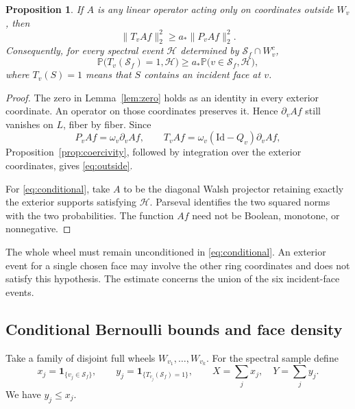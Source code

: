 \documentclass[11pt]{amsart}
\newtheorem{proposition}[theorem]{Proposition}
\theoremstyle{remark}
\newcommand{\Prob}{\mathbb P}
\newcommand{\one}{\mathbf 1}
\newcommand{\Id}{\mathrm{Id}}
\newcommand{\cS}{\mathcal S}
\newcommand{\astar}{a_*}
\begin{document}
\begin{proposition}\label{prop:outside}
If $A$ is any linear operator acting only on coordinates outside $W_v$, then
\begin{equation}\label{eq:outside}
 \|T_vAf\|_2^2\ge\astar\|P_vAf\|_2^2.
\end{equation}
Consequently, for every spectral event $\mathcal H$ determined by $\cS_f\cap W_v^c$,
\begin{equation}\label{eq:conditional}
 \Prob\bigl(T_v(\cS_f)=1,\mathcal H\bigr)
 \ge\astar\Prob\bigl(v\in\cS_f,\mathcal H\bigr),
\end{equation}
where $T_v(S)=1$ means that $S$ contains an incident face at $v$.
\end{proposition}
\begin{proof}
The zero in Lemma~\ref{lem:zero} holds as an identity in every exterior coordinate. An operator on those coordinates preserves it. Hence $\partial_vAf$ still vanishes on $L$, fiber by fiber. Since
\[
 P_vAf=\omega_v\partial_vAf,
 \qquad T_vAf=\omega_v(\Id-Q_v)\partial_vAf,
\]
Proposition~\ref{prop:coercivity}, followed by integration over the exterior coordinates, gives \eqref{eq:outside}.

For \eqref{eq:conditional}, take $A$ to be the diagonal Walsh projector retaining exactly the exterior supports satisfying $\mathcal H$. Parseval identifies the two squared norms with the two probabilities. The function $Af$ need not be Boolean, monotone, or nonnegative.
\end{proof}

The whole wheel must remain unconditioned in \eqref{eq:conditional}. An exterior event for a single chosen face may involve the other ring coordinates and does not satisfy this hypothesis. The estimate concerns the union of the six incident-face events.

\subsection{Conditional Bernoulli bounds and face density}\label{sec:amplification}

Take a family of disjoint full wheels $W_{v_1},\ldots,W_{v_k}$. For the spectral sample define
\[
 x_j=\one_{\{v_j\in\cS_f\}},\qquad
 y_j=\one_{\{T_{v_j}(\cS_f)=1\}},
 \qquad X=\sum_jx_j,\quad Y=\sum_jy_j.
\]
We have $y_j\le x_j$.
\end{document}
